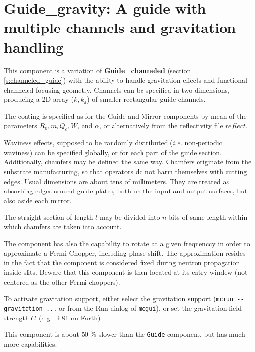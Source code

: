 \section{Guide\_gravity: A guide with multiple channels and gravitation handling}
\label{s:guide_gravity}


This component is a variation of {\bf Guide\_channeled}
(section \ref{s:channeled_guide}) with the ability to handle
gravitation effects and functional channeled focusing geometry.
Channels can be specified in two dimensions,
producing a 2D array ($k, k_h$) of smaller rectangular guide channels.

The coating is specified as for the Guide and Mirror components by mean of the parameters $R_0, m, Q_c, W$, and $\alpha$, or alternatively from the reflectivity file $reflect$.

Waviness effects, supposed to be randomly distributed
(\emph{i.e.} non-periodic waviness)
can be specified globally, or for each part of the guide section.
Additionally, chamfers
may be defined the same way.
Chamfers originate from the substrate manufacturing, so that operators do not harm themselves with cutting edges. Usual dimensions are about tens of millimeters. They are treated as absorbing edges around guide plates, both on the input and output surfaces, but also aside each mirror.

The straight section of length $l$ may be divided into $n$ bits of same length
within which chamfers are taken into account.

The component has also the capability to rotate at a given frequenccy in order to approximate a Fermi Chopper, including phase shift. The approximation resides in the fact that the component is considered fixed during neutron propagation inside slits. Beware that this component is then located at its entry window (not centered as the other Fermi choppers).

To activate gravitation support, either select the \MCS gravitation support (\verb+mcrun --gravitation ...+ or from the Run dialog of \verb+mcgui+),
or set the gravitation field strength $G$ (e.g. -9.81 on Earth).

This component is about 50 \% slower than the \verb+Guide+ component, but has much more capabilities.


